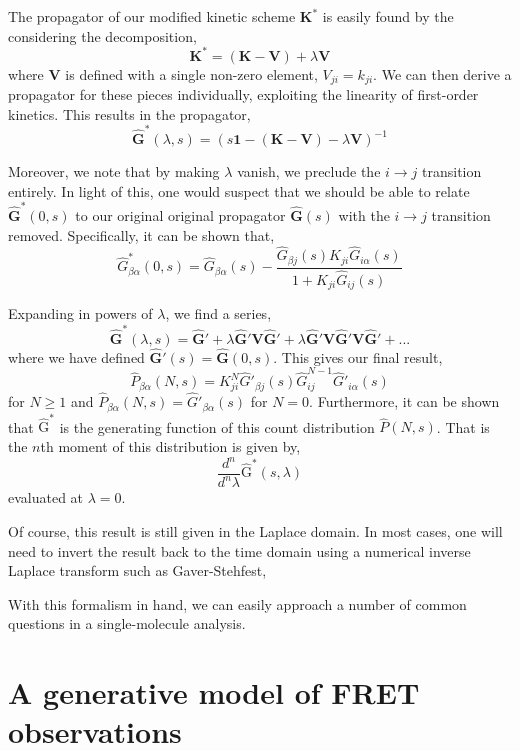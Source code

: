 \documentclass{article}
\begin{document}
The propagator of our modified kinetic scheme $\mathbf{K}^*$ is easily
found by the considering the decomposition,
\[ \mathbf{K}^* = (\mathbf{K} - \mathbf{V}) + \lambda \mathbf{V} \]
where $\mathbf V$ is defined with a single non-zero element, $V_{ji} =
k_{ji}$. 
We can then derive a propagator for these pieces
individually, exploiting the linearity of first-order kinetics.
This results in the propagator,
\[ \mathbf{\hat G}^*(\lambda, s) = \left(s \mathbf{1} - (\mathbf{K} - \mathbf{V}) - \lambda \mathbf{V} \right)^{-1} \]

Moreover, we note that by making $\lambda$ vanish, we preclude the $i
\rightarrow j$ transition entirely. In light of this, one would suspect that we should
be able to relate $\mathbf{\hat G^*}(0, s)$ to our original original
propagator $\mathbf{\hat G}(s)$ with the $i \rightarrow j$ transition
removed. Specifically, it can be shown that,
\[ \hat G^*_{\beta\alpha}(0, s) = \hat G_{\beta\alpha}(s) -
\frac{\hat G_{\beta j}(s) K_{ji} \hat G_{i\alpha}(s)}{1 + K_{ji} \hat G_{ij}(s)}
\]

Expanding in powers of $\lambda$, we find a series,
\[ \mathbf{\hat G}^*(\lambda, s) = \mathbf{\hat G'}
  + \lambda \mathbf{\hat G'} \mathbf{V} \mathbf{\hat G'}
  + \lambda \mathbf{\hat G'} \mathbf{V} \mathbf{\hat G'} \mathbf{V} \mathbf{\hat G'}
  + ...
\]
where we have defined $\mathbf{\hat G'}(s) = \mathbf{\hat G}(0, s)$.
This gives our final result,
\[ \hat P_{\beta\alpha}(N,s) = K_{ji}^N \hat G'_{\beta j}(s) \hat G_{ij}^{N-1} \hat G'_{i\alpha}(s) \]
for $N \ge 1$ and $\hat P_{\beta\alpha}(N,s) = \hat
G'_{\beta\alpha}(s)$ for $N=0$. Furthermore, it can be shown that $\mathrm{\hat G^*}$ is the generating function of this count distribution $\hat P(N,s)$. That is the $n$th moment of this
distribution is given by,
\[ \frac{d^n}{d^n \lambda} \mathrm{\hat G^*}(s, \lambda) \]
evaluated at $\lambda = 0$.

Of course, this result is still given in the Laplace domain. In most
cases, one will need to invert the result back to the time domain
using a numerical inverse Laplace transform such as Gaver-Stehfest,



With this formalism in hand, we can easily approach a number of common
questions in a single-molecule analysis.


\section{A generative model of FRET observations}
\end{document}
